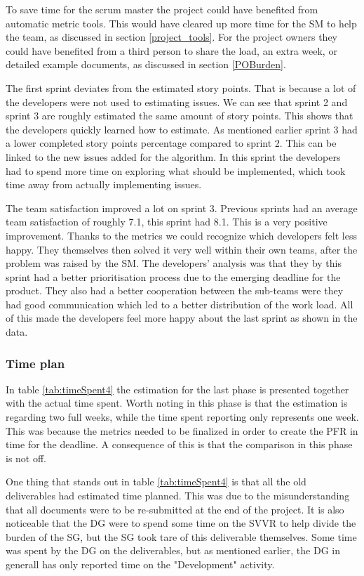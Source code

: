 \documentclass{article}
\begin{document}
To save time for the scrum master the project could have benefited from automatic metric tools. This would have cleared up more time for the SM to help the team, as discussed in section \ref{project_tools}. For the project owners they could have benefited from a third person to share the load, an extra week, or detailed example documents, as discussed in section \ref{POBurden}.

The first sprint deviates from the estimated story points. That is because a lot of the developers were not used to estimating issues. We can see that sprint 2 and sprint 3 are roughly estimated the same amount of story points. This shows that the developers quickly learned how to estimate. As mentioned earlier sprint 3 had a lower completed story points percentage compared to sprint 2. This can be linked to the new issues added for the algorithm. In this sprint the developers had to spend more time on exploring what should be implemented, which took time away from actually implementing issues.

The team satisfaction improved a lot on sprint 3. Previous  sprints had an average team satisfaction of roughly 7.1, this sprint had 8.1. This is a very positive improvement. Thanks to the metrics we could recognize which developers felt less happy. They themselves then solved it very well within their own teams, after the problem was raised by the SM. The developers' analysis was that they by this sprint had a better prioritisation process due to the emerging deadline for the product. They also had a better cooperation between the sub-teams were they had good communication which led to a better distribution of the work load. All of this made the developers feel more happy about the last sprint as shown in the data.

\subsubsection{Time plan}
In table \ref{tab:timeSpent4} the estimation for the last phase is presented together with the actual time spent. Worth noting in this phase is that the estimation is regarding two full weeks, while the time spent reporting only represents one week. This was because the metrics needed to be finalized in order to create the PFR in time for the deadline. A consequence of this is that the comparison in this phase is not off. 

One thing that stands out in table \ref{tab:timeSpent4} is that all the old deliverables had estimated time planned. This was due to the misunderstanding that all documents were to be re-submitted at the end of the project. It is also noticeable that the DG were to spend some time on the SVVR to help divide the burden of the SG, but the SG took tare of this deliverable themselves. Some time was spent by the DG on the deliverables, but as mentioned earlier, the DG in generall has only reported time on the "Development" activity. 
\end{document}
